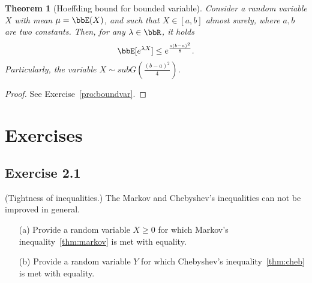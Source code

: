 \documentclass[11pt]{article}
\theoremstyle{plain}
\newtheorem{thm}{Theorem}[section]
\theoremstyle{definition}
\begin{document}
\begin{thm}[Hoeffding bound for bounded variable]\label{thm:boundvar}
Consider a random variable $X$ with mean $\mu = \bbE(X)$, and such that $X \in [a,b]$ almost surely, where $a, b$ are two constants. Then, for any $\lambda \in \bbR$, it holds
\begin{equation}
	\bbE[e^{\lambda X}] \leq e^{\frac{s(b-a)^2}{8}}.
\end{equation}
Particularly, the variable $X \sim subG(\frac{(b-a)^2}{4})$.
\end{thm}

\begin{proof}
	See Exercise~\ref{pro:boundvar}.
\end{proof}


\section{Exercises}

\subsection{Exercise 2.1} (Tightness of inequalities.) The Markov and Chebyshev's inequalities can not be improved in general. 
\begin{enumerate}
	\item[(a)] Provide a random variable $X \geq 0$ for which Markov's inequality~\eqref{thm:markov} is met with equality.  
	\item[(b)] Provide a random variable $Y$ for which Chebyshev's inequality~\eqref{thm:cheb} is met with equality.  
\end{enumerate}
\end{document}
